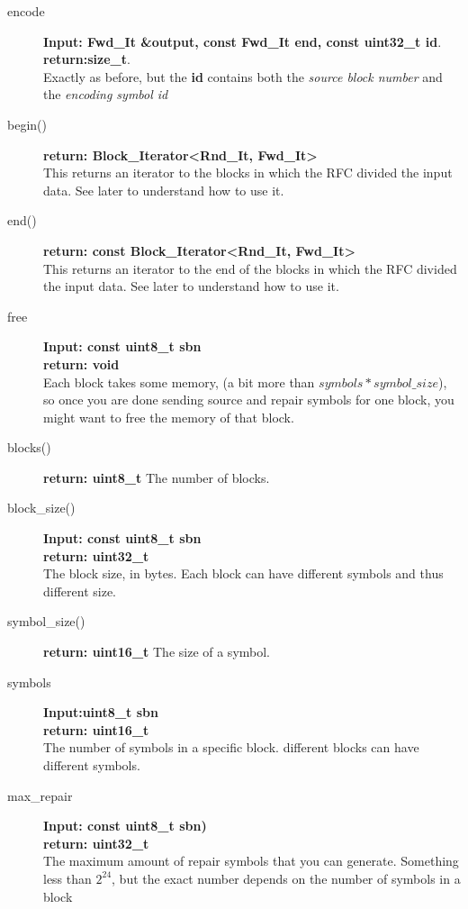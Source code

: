 \documentclass[11pt,a4paper]{refart}
\begin{document}
\begin{description}
\item[encode] \textbf{Input: Fwd\_It \&output, const Fwd\_It end, const uint32\_t id}.\\
\textbf{return:size\_t}.\\
Exactly as before, but the \textbf{id} contains both the \textit{source block number} and the \textit{encoding symbol id}

\item[begin()] \textbf{return: Block\_Iterator<Rnd\_It, Fwd\_It>}\\
This returns an iterator to the blocks in which the RFC divided the input data. See later to understand how to use it.
\item[end()] \textbf{return: const Block\_Iterator<Rnd\_It, Fwd\_It>}\\
This returns an iterator to the end of the blocks in which the RFC divided the input data. See later to understand how to use it.

\item [free] \textbf{Input: const uint8\_t sbn}\\
\textbf{return: void}\\
Each block takes some memory, (a bit more than $symbols * symbol\_size$), so once you are done sending source and repair symbols for one block,
you might want to free the memory of that block.

\item[blocks()] \textbf{return: uint8\_t} The number of blocks.

\item[block\_size()] \textbf{Input: const uint8\_t sbn}\\
\textbf{return: uint32\_t}\\
The block size, in bytes. Each block can have different symbols and thus different size.

\item[symbol\_size()] \textbf{return: uint16\_t} The size of a symbol.

\item[symbols] \textbf{Input:uint8\_t sbn}\\
\textbf{return: uint16\_t}\\
The number of symbols in a specific block. different blocks can have different symbols.

\item[max\_repair] \textbf{Input: const uint8\_t sbn)}\\
\textbf{return: uint32\_t}\\
The maximum amount of repair symbols that you can generate. Something less than $2^{24}$, but the exact number depends on the number of symbols
in a block
\end{description}
\end{document}
